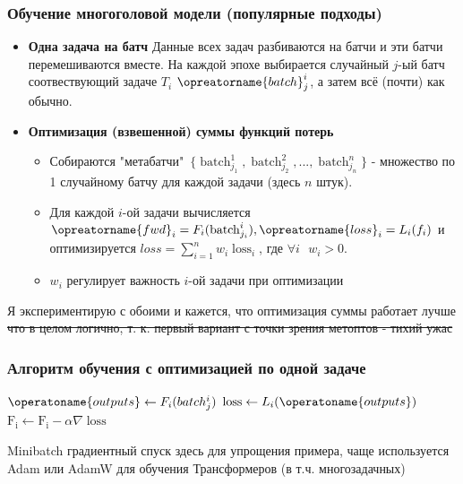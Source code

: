 \documentclass[aspectratio=169]{beamer}
\begin{document}
\begin{frame}
	\frametitle{Обучение многоголовой модели (популярные подходы)}
	\begin{itemize}
		\item \textbf{Одна задача на батч} Данные всех задач разбиваются на батчи и эти батчи перемешиваются вместе. На каждой эпохе выбирается случайный $j$-ый батч соотвествующий задаче $T_i$ $\opreatorname{batch}_j^i$, а затем всё (почти) как обычно.
		\item \textbf{Оптимизация (взвешенной) суммы функций потерь} 
			\begin{itemize}
				\item Собираются "метабатчи"\ $\{ \operatorname{batch}^{1}_{j_1}, \operatorname{batch}^{2}_{j_2}, ..., \operatorname{batch}^{n}_{j_n} \}$ - множество по 1 случайному батчу для каждой задачи (здесь $n$ штук). 
				\item Для каждой $i$-ой задачи вычисляется $\opreatorname{fwd}_i = F_i(\operatorname{batch}^{i}_{j_i}), \opreatorname{loss}_i = L_i(f_i)$ и оптимизируется $loss = \sum_{i = 1}^{n} w_i \operatorname{loss}_i$, где $\forall i \text{ } w_i > 0$.
				\item $w_i$ регулирует важность $i$-ой задачи при оптимизации
			\end{itemize}
	\end{itemize}
	Я экспериментирую с обоими и кажется, что оптимизация суммы работает лучше \sout{что в целом логично, т. к. первый вариант с точки зрения метоптов - тихий ужас}
\end{frame}

\begin{frame}
	\frametitle{Алгоритм обучения с оптимизацией по одной задаче}
	\begin{algorithmic}
				\State $\operatoname{outputs} \gets F_i(batch^{i}_{j})$
				\State $\operatorname{loss} \gets L_i(\operatoname{outputs})$
				\State $\operatorname{F_i} \gets \operatorname{F_i} - \alpha \nabla \operatorname{loss}$ 
			\EndFor
		\EndFor
	\end{algorithmic}
	Minibatch градиентный спуск здесь для упрощения примера, чаще используется Adam или AdamW для обучения Трансформеров (в т.ч. многозадачных)
\end{frame}
\end{document}
